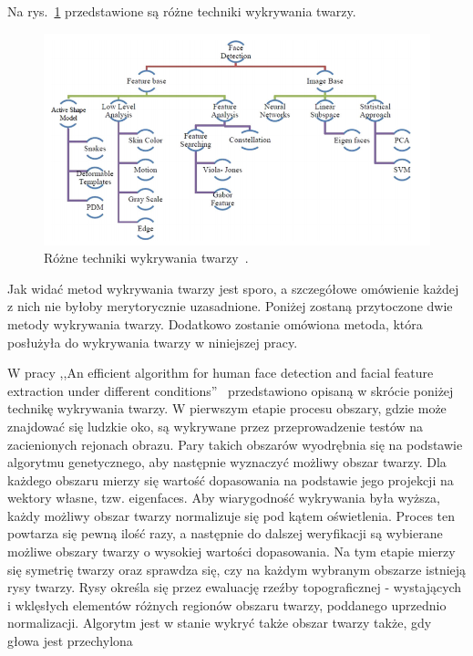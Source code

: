 \documentclass[a4paper,twoside,12pt]{book}
\begin{document}
    Na rys.~\ref{fig.technikiWykrywaniaTwarzy} przedstawione są różne techniki wykrywania twarzy.
    \begin{figure}
        \centering
        \includegraphics[width=15cm]{Obrazy/technikiWykrywaniaTwarzy.jpg}
        \caption{Różne techniki wykrywania twarzy~\cite{faceDetectionTechniques}.}
        \label{fig.technikiWykrywaniaTwarzy}
    \end{figure}


    Jak widać metod wykrywania twarzy jest sporo,
    a szczegółowe omówienie każdej z nich nie byłoby merytorycznie uzasadnione.
    Poniżej zostaną przytoczone dwie metody wykrywania twarzy.
    Dodatkowo zostanie omówiona metoda, która posłużyła do wykrywania twarzy w niniejszej pracy.

    W pracy ,,An efficient algorithm for human face detection and facial
    feature extraction under different conditions''~\cite{wongLamSiu}
    przedstawiono opisaną w skrócie poniżej technikę wykrywania twarzy.
    W pierwszym etapie procesu obszary, gdzie może znajdować się ludzkie oko,
    są wykrywane przez przeprowadzenie testów na zacienionych rejonach obrazu.
    Pary takich obszarów wyodrębnia się na podstawie algorytmu genetycznego,
    aby następnie wyznaczyć możliwy obszar twarzy.
    Dla każdego obszaru mierzy się wartość dopasowania na podstawie jego projekcji na wektory własne,
    tzw. eigenfaces.
    Aby wiarygodność wykrywania była wyższa,
    każdy możliwy obszar twarzy normalizuje się pod kątem oświetlenia.
    Proces ten powtarza się pewną ilość razy,
    a następnie do dalszej weryfikacji są wybierane możliwe obszary twarzy o wysokiej wartości dopasowania.
    Na tym etapie mierzy się symetrię twarzy oraz sprawdza się,
    czy na każdym wybranym obszarze istnieją rysy twarzy.
    Rysy określa się przez ewaluację rzeźby topograficznej - wystających i wklęsłych elementów
    różnych regionów obszaru twarzy, poddanego uprzednio normalizacji.
    Algorytm jest w stanie wykryć także obszar twarzy także, gdy głowa jest przechylona
\end{document}
